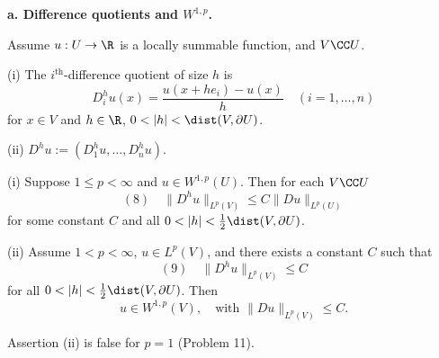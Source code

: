 \textbf{a. Difference quotients and $W^{1,p}$.}

Assume $u : U \to \R$ is a locally summable function, and $V \CC U$.

\begin{definition}
\label{def:difference-quotients}
(i) The $i^{\text{th}}$-difference quotient of size $h$ is
$$D_i^h u(x) = \frac{u(x + he_i) - u(x)}{h} \quad (i = 1, \ldots, n)$$
for $x \in V$ and $h \in \R$, $0 < |h| < \dist(V, \partial U)$.

(ii) $D^h u := (D_1^h u, \ldots, D_n^h u)$.
\end{definition}

\begin{theorem}
\label{thm:difference-quotients-weak-derivatives}
(i) Suppose $1 \le p < \infty$ and $u \in W^{1,p}(U)$. Then for each $V \CC U$
$$(8) \quad \|D^h u\|_{L^p(V)} \le C\|Du\|_{L^p(U)}$$
for some constant $C$ and all $0 < |h| < \frac{1}{2}\dist(V, \partial U)$.

(ii) Assume $1 < p < \infty$, $u \in L^p(V)$, and there exists a constant $C$ such that
$$(9) \quad \|D^h u\|_{L^p(V)} \le C$$
for all $0 < |h| < \frac{1}{2}\dist(V, \partial U)$. Then
$$u \in W^{1,p}(V), \quad \text{with } \|Du\|_{L^p(V)} \le C.$$
\end{theorem}

\begin{remark}[Assertion (ii) fails for $p=1$]
\label{rem:difference-quotient-p1-fails}
Assertion (ii) is false for $p = 1$ (Problem 11).
\end{remark}

